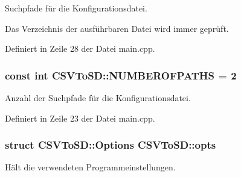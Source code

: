 Suchpfade für die Konfigurationsdatei. 

Das Verzeichnis der ausführbaren Datei wird immer geprüft. 

Definiert in Zeile 28 der Datei main.\-cpp.

\hypertarget{namespaceCSVToSD_ad0eb84e08f9ed06630458f5dcc91b511}{
\subsubsection[{N\-U\-M\-B\-E\-R\-O\-F\-P\-A\-T\-H\-S}]{\setlength{\rightskip}{0pt plus 5cm}const int C\-S\-V\-To\-S\-D\-::\-N\-U\-M\-B\-E\-R\-O\-F\-P\-A\-T\-H\-S = 2}}\label{namespaceCSVToSD_ad0eb84e08f9ed06630458f5dcc91b511}


Anzahl der Suchpfade für die Konfigurationsdatei. 



Definiert in Zeile 23 der Datei main.\-cpp.

\hypertarget{namespaceCSVToSD_a16dddcd8b3566666b93a413bbfec206e}{
\subsubsection[{opts}]{\setlength{\rightskip}{0pt plus 5cm}struct {\bf C\-S\-V\-To\-S\-D\-::\-Options}  C\-S\-V\-To\-S\-D\-::opts}}\label{namespaceCSVToSD_a16dddcd8b3566666b93a413bbfec206e}


Hält die verwendeten Programmeinstellungen. 

